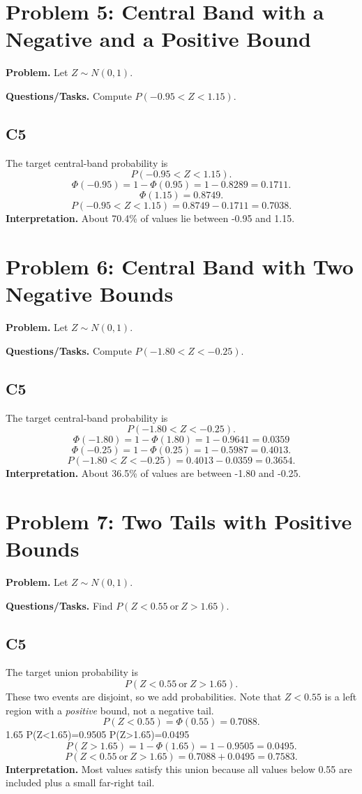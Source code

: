 \section{Problem 5: Central Band with a Negative and a Positive Bound}
\textbf{Problem.} Let \(Z\sim N(0,1)\).

\textbf{Questions/Tasks.} Compute \(P(-0.95<Z<1.15)\).

\subsection*{C5}
The target central-band probability is
\[
P(-0.95<Z<1.15).
\]
\[
\Phi(-0.95)=1-\Phi(0.95)=1-0.8289=0.1711.
\]
\[
\Phi(1.15)=0.8749.
\]
\[
P(-0.95<Z<1.15)=0.8749-0.1711=0.7038.
\]
\textbf{Interpretation.} About 70.4\% of values lie between -0.95 and 1.15.

\section{Problem 6: Central Band with Two Negative Bounds}
\textbf{Problem.} Let \(Z\sim N(0,1)\).

\textbf{Questions/Tasks.} Compute \(P(-1.80<Z<-0.25)\).

\subsection*{C5}
The target central-band probability is
\[
P(-1.80<Z<-0.25).
\]
\[
\Phi(-1.80)=1-\Phi(1.80)=1-0.9641=0.0359
\]
\[
\Phi(-0.25)=1-\Phi(0.25)=1-0.5987=0.4013.
\]
\[
P(-1.80<Z<-0.25)=0.4013-0.0359=0.3654.
\]
\textbf{Interpretation.} About 36.5\% of values are between -1.80 and -0.25.

\section{Problem 7: Two Tails with Positive Bounds}
\textbf{Problem.} Let \(Z\sim N(0,1)\).

\textbf{Questions/Tasks.} Find \(P(Z<0.55\ \text{or}\ Z>1.65)\).

\subsection*{C5}
The target union probability is
\[
P(Z<0.55\ \text{or}\ Z>1.65).
\]
These two events are disjoint, so we add probabilities.
Note that \(Z<0.55\) is a left region with a \emph{positive} bound, not a negative tail.
\[
P(Z<0.55)=\Phi(0.55)=0.7088.
\]
\StandardNormalComplementMirrorGraph
{1.65}
{P(Z<1.65)=0.9505}
{P(Z>1.65)=0.0495}
\[
P(Z>1.65)=1-\Phi(1.65)=1-0.9505=0.0495.
\]
\[
P(Z<0.55\ \text{or}\ Z>1.65)=0.7088+0.0495=0.7583.
\]
\textbf{Interpretation.} Most values satisfy this union because all values below 0.55 are included plus a small far-right tail.


